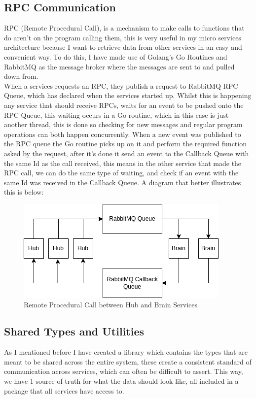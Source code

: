 \documentclass[titlepage]{article}
\begin{document}
\subsection{RPC Communication}
RPC (Remote Procedural Call), is a mechanism to make calls to functions that do aren't on the program calling them, this is very useful in my micro services architecture because I want to retrieve data from other services in an easy and convenient way. To do this, I have made use of Golang's Go Routines and RabbitMQ as the message broker where the messages are sent to and pulled down from. \\

When a services requests an RPC, they publish a request to RabbitMQ RPC Queue, which has declared when the services started up. Whilst this is happening any service that should receive RPCs, waits for an event to be pushed onto the RPC Queue, this waiting occurs in a Go routine, which in this case is just another thread, this is done so checking for new messages and regular program operations can both happen concurrently. When a new event was published to the RPC queue the Go routine picks up on it and perform the required function asked by the request, after it's done it send an event to the Callback Queue with the same Id as the call received, this means in the other service that made the RPC call, we can do the same type of waiting, and check if an event with the same Id was received in the Callback Queue. A diagram that better illustrates this is below:

\begin{figure}
\includegraphics[width=\textwidth]{RPC.png}
\caption{Remote Procedural Call between Hub and Brain Services}
\centering
\end{figure}
\pagebreak

\subsection{Shared Types and Utilities}
As I mentioned before I have created a library which contains the types that are meant to be shared across the entire system, these create a consistent standard of communication across services, which can often be difficult to assert. This way, we have 1 source of truth for what the data should look like, all included in a package that all services have access to. \\
\end{document}
